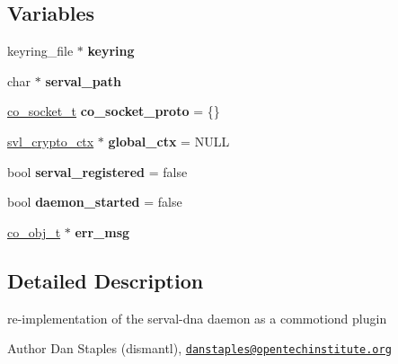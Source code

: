 \subsection*{Variables}
\begin{DoxyCompactItemize}
\item 
\hypertarget{serval-dna_8c_a7a52b0448c6882066b1f48ba930b679a}{keyring\+\_\+file $\ast$ {\bfseries keyring}}\label{serval-dna_8c_a7a52b0448c6882066b1f48ba930b679a}

\item 
\hypertarget{serval-dna_8c_ae6dcf225692e114eb5dade5319d1c2b1}{char $\ast$ {\bfseries serval\+\_\+path}}\label{serval-dna_8c_ae6dcf225692e114eb5dade5319d1c2b1}

\item 
\hypertarget{serval-dna_8c_aa3bc9a031270798ec23f3e4d5d8bd194}{\hyperlink{structco__socket__t}{co\+\_\+socket\+\_\+t} {\bfseries co\+\_\+socket\+\_\+proto} = \{\}}\label{serval-dna_8c_aa3bc9a031270798ec23f3e4d5d8bd194}

\item 
\hypertarget{serval-dna_8c_aee0ec69f237cb29e0fc7ff6de57f4c71}{\hyperlink{structsvl__crypto__ctx}{svl\+\_\+crypto\+\_\+ctx} $\ast$ {\bfseries global\+\_\+ctx} = N\+U\+L\+L}\label{serval-dna_8c_aee0ec69f237cb29e0fc7ff6de57f4c71}

\item 
\hypertarget{serval-dna_8c_a0df258448a082ec4ee8793665db88117}{bool {\bfseries serval\+\_\+registered} = false}\label{serval-dna_8c_a0df258448a082ec4ee8793665db88117}

\item 
\hypertarget{serval-dna_8c_a67540b930502e6cd48eb1f9bf6fd9392}{bool {\bfseries daemon\+\_\+started} = false}\label{serval-dna_8c_a67540b930502e6cd48eb1f9bf6fd9392}

\item 
\hypertarget{serval-dna_8c_a35312d60364fde2d5ba79a8eb0ec7425}{\hyperlink{structco__obj__t}{co\+\_\+obj\+\_\+t} $\ast$ {\bfseries err\+\_\+msg}}\label{serval-dna_8c_a35312d60364fde2d5ba79a8eb0ec7425}

\end{DoxyCompactItemize}


\subsection{Detailed Description}
re-\/implementation of the serval-\/dna daemon as a commotiond plugin 

\begin{DoxyAuthor}{Author}
Dan Staples (dismantl), \href{mailto:danstaples@opentechinstitute.org}{\tt danstaples@opentechinstitute.\+org} 
\end{DoxyAuthor}


